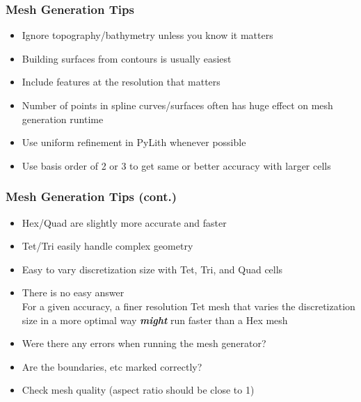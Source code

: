 \documentclass[aspectratio=169]{beamer}
\begin{document}
\begin{frame}
  \frametitle{Mesh Generation Tips}

  \begin{itemize}
    \begin{itemize}
    \item Ignore topography/bathymetry unless you know it matters
    \end{itemize}\pause
    \begin{itemize}
    \item Building surfaces from contours is usually easiest
    \item Include features at the resolution that matters
    \end{itemize}\pause
    \begin{itemize}
    \item Number of points in spline curves/surfaces often has huge effect on mesh generation runtime
    \item Use uniform refinement in PyLith whenever possible
    \item Use basis order of 2 or 3 to get same or better accuracy with larger cells
    \end{itemize}
  \end{itemize}

\end{frame}


\begin{frame}
  \frametitle{Mesh Generation Tips (cont.)}
 
  \begin{itemize}
    \begin{itemize}
    \item Hex/Quad are slightly more accurate and faster
    \item Tet/Tri easily handle complex geometry
    \item Easy to vary discretization size with Tet, Tri, and Quad cells
    \item There is no easy answer\\
      For a given accuracy, a finer resolution Tet mesh that varies
      the discretization size in a more optimal way {\bf\it might} run
      faster than a Hex mesh
    \end{itemize}\pause
    \begin{itemize}
    \item Were there any errors when running the mesh generator?
    \item Are the boundaries, etc marked correctly?
    \item Check mesh quality (aspect ratio should be close to 1)
    \end{itemize}
  \end{itemize}

\end{frame}
\end{document}
